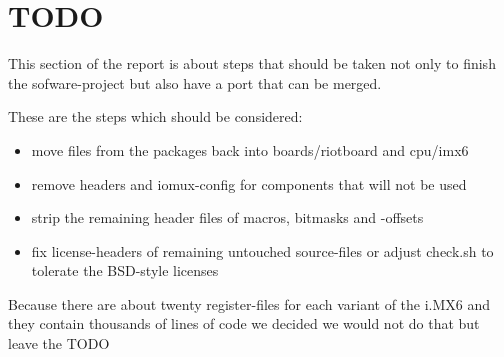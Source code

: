 \section{TODO}

This section of the report is about steps that should be taken not only to finish the sofware-project but also have a port that can be merged.

These are the steps which should be considered:
\begin{itemize}
\item move files from the packages back into boards/riotboard and cpu/imx6
\item remove headers and iomux-config for components that will not be used
\item strip the remaining header files of macros, bitmasks and -offsets
\item fix license-headers of remaining untouched source-files or adjust check.sh to tolerate the BSD-style licenses
\end{itemize}

Because there are about twenty register-files for each variant of the i.MX6 and they contain thousands of lines of code we decided we would not do that but leave the TODO  
